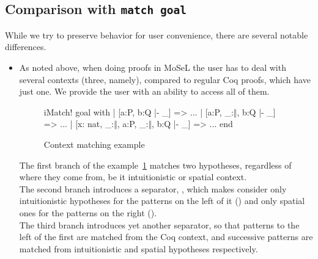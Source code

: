 \subsection{Comparison with \texttt{match goal}}

While we try to preserve  behavior for user convenience, there are several notable differences.

\begin{itemize}
\item As noted above, when doing proofs in MoSeL the user has to deal with several contexts (three, namely), compared to regular Coq proofs, which have just one.
  We provide the user with an ability to access all of them.
  \begin{figure}[H]
  \begin{coq}
       iMatch! goal with
       | [a:P, b:Q |- _] => ...
       | [a:P, _:$\Vert$, b:Q |- _] => ...
       | [x: nat, _:$\Vert$, a:P, _:$\Vert$, b:Q |- _] => ...
       end
   \end{coq}
   \caption{Context matching example}
   \label{fig:example:contex_matching}
  \end{figure}
  The first branch of the example~\ref{fig:example:contex_matching} matches two hypotheses, regardless of where they come from, be it intuitionistic or spatial context.\\
  The second branch introduces a separator, \coqe{_:$\Vert$}, which makes  consider only intuitionistic hypotheses for the patterns on the left of it () and only spatial ones for the patterns on the right ().\\
  The third branch introduces yet another separator, so that patterns to the left of the first \coqe{_:$\Vert$} are matched from the Coq context, and successive patterns are matched from intuitionistic and spatial hypotheses respectively.


\end{itemize}

